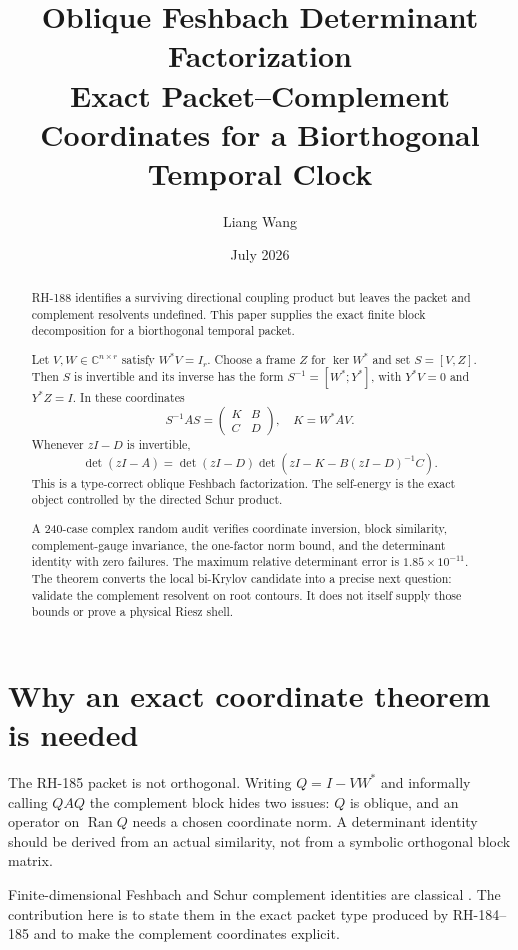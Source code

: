 \documentclass[12pt]{article}
\title{Oblique Feshbach Determinant Factorization\\
\large Exact Packet--Complement Coordinates for a Biorthogonal Temporal Clock}
\author{Liang Wang}
\date{July 2026}
\theoremstyle{remark}
\begin{document}
\maketitle

\begin{abstract}
RH-188 identifies a surviving directional coupling product but leaves the
packet and complement resolvents undefined.  This paper supplies the exact
finite block decomposition for a biorthogonal temporal packet.

Let $V,W\in\mathbb C^{n\times r}$ satisfy $W^*V=I_r$.  Choose a frame $Z$
for $\ker W^*$ and set $S=[V,Z]$.  Then $S$ is invertible and its inverse has
the form $S^{-1}=[W^*;Y^*]$, with $Y^*V=0$ and $Y^*Z=I$.  In these coordinates
\[
 S^{-1}AS=
 \begin{pmatrix}K&B\\C&D\end{pmatrix},
 \quad
 K=W^*AV.
\]
Whenever $zI-D$ is invertible,
\[
 \det(zI-A)
 =\det(zI-D)
 \det\!\left(zI-K-B(zI-D)^{-1}C\right).
\]
This is a type-correct oblique Feshbach factorization.  The self-energy is the
exact object controlled by the directed Schur product.

A 240-case complex random audit verifies coordinate inversion, block
similarity, complement-gauge invariance, the one-factor norm bound, and the
determinant identity with zero failures.  The maximum relative determinant
error is $1.85\times10^{-11}$.  The theorem converts the
local bi-Krylov candidate into a precise next question: validate the
complement resolvent on root contours.  It does not itself supply those
bounds or prove a physical Riesz shell.
\end{abstract}

\section{Why an exact coordinate theorem is needed}

The RH-185 packet is not orthogonal.  Writing $Q=I-VW^*$ and informally
calling $QAQ$ the complement block hides two issues: $Q$ is oblique, and an
operator on $\operatorname{Ran}Q$ needs a chosen coordinate norm.  A
determinant identity should be derived from an actual similarity, not from a
symbolic orthogonal block matrix.

Finite-dimensional Feshbach and Schur complement identities are classical
\citep{GohbergGoldbergKaashoek1990}.  The contribution here is to state them
in the exact packet type produced by RH-184--185 and to make the complement
coordinates explicit.
\end{document}
